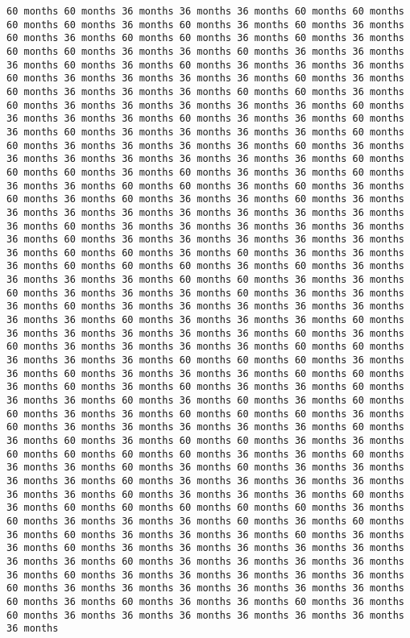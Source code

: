 \documentclass[11pt]{article}
\begin{document}
\begin{Verbatim}[commandchars=\\\{\}, frame=single, framerule=2mm, rulecolor=\color{outerrorbackground}]
60 months 60 months 36 months 36 months 36 months 60 months 60 months 60 months 60 months 36 months 60 months 36 months 60 months 36 months 60 months 36 months 60 months 60 months 36 months 60 months 36 months 60 months 60 months 36 months 36 months 60 months 36 months 36 months 36 months 60 months 36 months 60 months 36 months 36 months 36 months 60 months 36 months 36 months 36 months 36 months 60 months 36 months 60 months 36 months 36 months 36 months 60 months 60 months 36 months 60 months 36 months 36 months 36 months 36 months 36 months 60 months 36 months 36 months 36 months 60 months 36 months 36 months 60 months 36 months 60 months 36 months 36 months 36 months 36 months 60 months 60 months 36 months 36 months 36 months 36 months 60 months 36 months 36 months 36 months 36 months 36 months 36 months 36 months 60 months 60 months 60 months 36 months 60 months 36 months 36 months 60 months 36 months 36 months 60 months 60 months 36 months 60 months 36 months 60 months 36 months 60 months 36 months 36 months 60 months 36 months 36 months 36 months 36 months 36 months 36 months 36 months 36 months 36 months 60 months 36 months 36 months 36 months 36 months 36 months 36 months 60 months 36 months 36 months 36 months 36 months 36 months 36 months 60 months 60 months 36 months 60 months 36 months 36 months 36 months 60 months 60 months 60 months 36 months 60 months 36 months 36 months 36 months 36 months 60 months 60 months 36 months 36 months 60 months 36 months 36 months 36 months 60 months 36 months 36 months 36 months 60 months 36 months 36 months 36 months 36 months 36 months 36 months 36 months 60 months 36 months 36 months 36 months 60 months 36 months 36 months 36 months 36 months 36 months 60 months 36 months 60 months 36 months 36 months 36 months 36 months 60 months 60 months 36 months 36 months 36 months 60 months 60 months 60 months 36 months 36 months 60 months 36 months 36 months 36 months 60 months 60 months 36 months 60 months 36 months 60 months 36 months 36 months 60 months 36 months 36 months 60 months 36 months 60 months 36 months 60 months 60 months 36 months 36 months 60 months 60 months 60 months 36 months 60 months 36 months 36 months 36 months 36 months 36 months 60 months 36 months 60 months 36 months 60 months 60 months 36 months 36 months 60 months 60 months 60 months 60 months 36 months 36 months 60 months 36 months 36 months 60 months 36 months 60 months 36 months 36 months 36 months 36 months 60 months 36 months 36 months 36 months 36 months 36 months 36 months 60 months 36 months 36 months 36 months 60 months 36 months 60 months 60 months 60 months 60 months 60 months 36 months 60 months 36 months 36 months 36 months 60 months 36 months 60 months 36 months 60 months 36 months 36 months 36 months 60 months 36 months 36 months 60 months 36 months 36 months 36 months 36 months 36 months 36 months 36 months 60 months 36 months 36 months 36 months 36 months 36 months 60 months 36 months 36 months 36 months 36 months 36 months 60 months 36 months 36 months 36 months 36 months 36 months 36 months 60 months 36 months 60 months 36 months 36 months 60 months 36 months 60 months 36 months 36 months 36 months 36 months 36 months 36 months 36 months 
\end{Verbatim}
\end{document}
